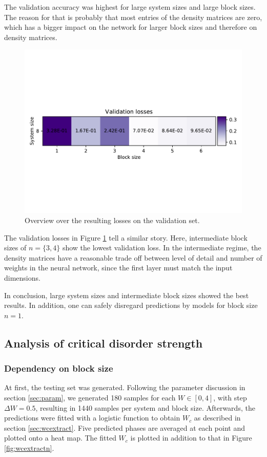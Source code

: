 \documentclass[reprint,amsmath,amssymb,aps,prb]{revtex4-2}
\begin{document}
The validation accuracy was highest for large system sizes and large block sizes. The reason for that is probably that most entries of the density matrices are zero, which has a bigger impact on the network for larger block sizes and therefore on density matrices.
\begin{figure}
	\centering
	\includegraphics[width=\linewidth]{../results/accuracy_loss_epochs/all_validation_losses}
	\caption{Overview over the resulting losses on the validation set.}
	\label{fig:all_validation_accuracy}
\end{figure}

The validation losses in Figure \ref{fig:all_validation_accuracy} tell a similar story. Here, intermediate block sizes of $n=\{3, 4\}$ show the lowest validation loss. In the intermediate regime, the density matrices have a reasonable trade off between level of detail and number of weights in the neural network, since the first layer must match the input dimensions.

In conclusion, large system sizes and intermediate block sizes showed the best results. In addition, one can safely disregard predictions by models for block size $n=1$.

\subsection{Analysis of critical disorder strength}
\subsubsection{Dependency on block size}
At first, the testing set was generated. Following the parameter discussion in section \ref{sec:param}, we generated 180 samples for each $W\in\left[0,4\right]$, with step $\Delta W=0.5$, resulting in 1440 samples per system and block size. Afterwards, the predictions were fitted with a logistic function to obtain $W_c$ as described in section \ref{sec:wcextract}.
Five predicted phases are averaged at each point and plotted onto a heat map. The fitted $W_c$ is plotted in addition to that in Figure \ref{fig:wcextractn}.
\end{document}
